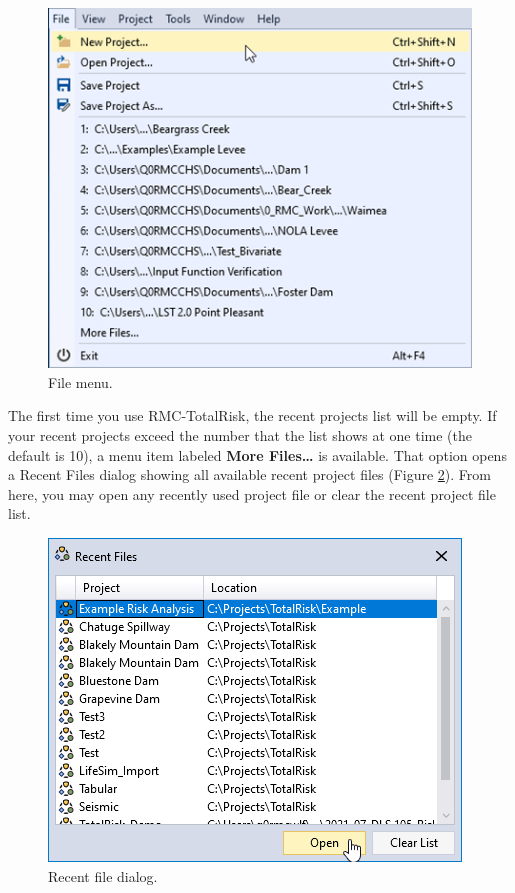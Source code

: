 \documentclass[
]{book}
\begin{document}
\begin{figure}

{\centering \includegraphics{images/figure6} 

}

\caption{File menu.}\label{fig:figure-6}
\end{figure}

The first time you use RMC-TotalRisk, the recent projects list will be empty. If your recent projects exceed the number that the list shows at one time (the default is 10), a menu item labeled \textbf{More Files\ldots{}} is available. That option opens a Recent Files dialog showing all available recent project files (Figure \ref{fig:figure-7}). From here, you may open any recently used project file or clear the recent project file list.

\begin{figure}

{\centering \includegraphics{images/figure7} 

}

\caption{Recent file dialog.}\label{fig:figure-7}
\end{figure}
\end{document}
